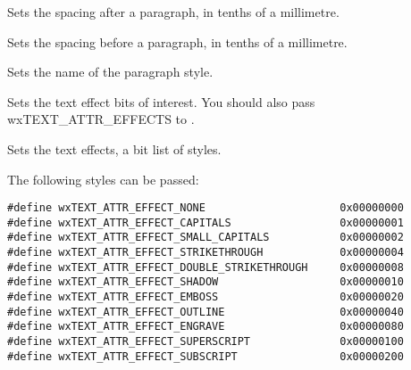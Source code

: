\label{wxtextattrexsetparagraphspacingafter}


Sets the spacing after a paragraph, in tenths of a millimetre.

\label{wxtextattrexsetparagraphspacingbefore}


Sets the spacing before a paragraph, in tenths of a millimetre.

\label{wxtextattrexsetparagraphstylename}


Sets the name of the paragraph style.

\label{wxtextattrexsettexteffectflags}


Sets the text effect bits of interest. You should also pass wxTEXT\_ATTR\_EFFECTS to .

\label{wxtextattrexsettexteffects}


Sets the text effects, a bit list of styles.

The following styles can be passed:

{\small
\begin{verbatim}
#define wxTEXT_ATTR_EFFECT_NONE                     0x00000000
#define wxTEXT_ATTR_EFFECT_CAPITALS                 0x00000001
#define wxTEXT_ATTR_EFFECT_SMALL_CAPITALS           0x00000002
#define wxTEXT_ATTR_EFFECT_STRIKETHROUGH            0x00000004
#define wxTEXT_ATTR_EFFECT_DOUBLE_STRIKETHROUGH     0x00000008
#define wxTEXT_ATTR_EFFECT_SHADOW                   0x00000010
#define wxTEXT_ATTR_EFFECT_EMBOSS                   0x00000020
#define wxTEXT_ATTR_EFFECT_OUTLINE                  0x00000040
#define wxTEXT_ATTR_EFFECT_ENGRAVE                  0x00000080
#define wxTEXT_ATTR_EFFECT_SUPERSCRIPT              0x00000100
#define wxTEXT_ATTR_EFFECT_SUBSCRIPT                0x00000200
\end{verbatim}
}

